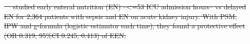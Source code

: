 \documentclass[10pt,letterpaper]{article}
\providecommand{\DIFdeltex}[1]{{\protect\color{red}\sout{#1}}}                      %
\providecommand{\DIFdelend}{} %
\providecommand{\DIFdel}[1]{\texorpdfstring{\DIFdeltex{#1}}{}} %
\DeclareRobustCommand{\DIFdelend}{\DIFOaddend \let\includegraphics\DIFOincludegraphics} %
\begin{document}
\DIFdel{\mbox{%
    \cite{wang2023early} }\hskip0pt%
  studied \textcolor{I}{early enteral nutrition (EN)
    --<=53 ICU admission hours--} vs \textcolor{C}{delayed EN} for
  \textcolor{P}{2,364 patients with sepsis and EN} on
  \textcolor{O}{acute kidney injury}. With PSM, IPW and g-formula
  (logistic estimator each time), they found a protective effect
  (OR 0.319, 95\%CI 0.245, 0.413) of EEN.
}%
\DIFdelend %
\end{document}
